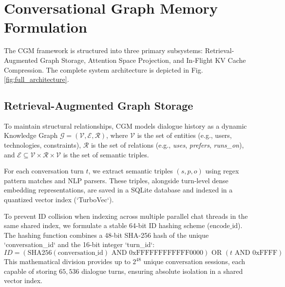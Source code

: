 \documentclass[conference]{IEEEtran}
\begin{document}
\section{Conversational Graph Memory Formulation}
The CGM framework is structured into three primary subsystems: Retrieval-Augmented Graph Storage, Attention Space Projection, and In-Flight KV Cache Compression. The complete system architecture is depicted in Fig. \ref{fig:full_architecture}.

\subsection{Retrieval-Augmented Graph Storage}
To maintain structural relationships, CGM models dialogue history as a dynamic Knowledge Graph $\mathcal{G} = (\mathcal{V}, \mathcal{E}, \mathcal{R})$, where $\mathcal{V}$ is the set of entities (e.g., users, technologies, constraints), $\mathcal{R}$ is the set of relations (e.g., \textit{uses}, \textit{prefers}, \textit{runs\_on}), and $\mathcal{E} \subseteq \mathcal{V} \times \mathcal{R} \times \mathcal{V}$ is the set of semantic triples. 

For each conversation turn $t$, we extract semantic triples $(s, p, o)$ using regex pattern matches and NLP parsers. These triples, alongside turn-level dense embedding representations, are saved in a SQLite database and indexed in a quantized vector index (`TurboVec`).

To prevent ID collision when indexing across multiple parallel chat threads in the same shared index, we formulate a stable 64-bit ID hashing scheme ($\text{encode\_id}$). The hashing function combines a 48-bit SHA-256 hash of the unique `conversation\_id` and the 16-bit integer `turn\_id`:
\begin{equation}
ID = (\text{SHA256}(\text{conversation\_id}) \text{ AND } \text{0xFFFFFFFFFFFF0000}) \text{ OR } (t \text{ AND } \text{0xFFFF})
\end{equation}
This mathematical division provides up to $2^{48}$ unique conversation sessions, each capable of storing $65,536$ dialogue turns, ensuring absolute isolation in a shared vector index.
\end{document}
